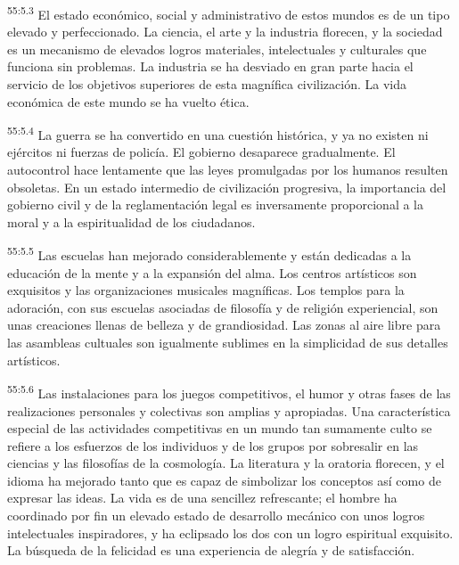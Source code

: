 \par
\textsuperscript{55:5.3} El estado económico, social y administrativo de estos mundos es de un tipo elevado y perfeccionado. La ciencia, el arte y la industria florecen, y la sociedad es un mecanismo de elevados logros materiales, intelectuales y culturales que funciona sin problemas. La industria se ha desviado en gran parte hacia el servicio de los objetivos superiores de esta magnífica civilización. La vida económica de este mundo se ha vuelto ética.

\par
\textsuperscript{55:5.4} La guerra se ha convertido en una cuestión histórica, y ya no existen ni ejércitos ni fuerzas de policía. El gobierno desaparece gradualmente. El autocontrol hace lentamente que las leyes promulgadas por los humanos resulten obsoletas. En un estado intermedio de civilización progresiva, la importancia del gobierno civil y de la reglamentación legal es inversamente proporcional a la moral y a la espiritualidad de los ciudadanos.

\par
\textsuperscript{55:5.5} Las escuelas han mejorado considerablemente y están dedicadas a la educación de la mente y a la expansión del alma. Los centros artísticos son exquisitos y las organizaciones musicales magníficas. Los templos para la adoración, con sus escuelas asociadas de filosofía y de religión experiencial, son unas creaciones llenas de belleza y de grandiosidad. Las zonas al aire libre para las asambleas cultuales son igualmente sublimes en la simplicidad de sus detalles artísticos.

\par
\textsuperscript{55:5.6} Las instalaciones para los juegos competitivos, el humor y otras fases de las realizaciones personales y colectivas son amplias y apropiadas. Una característica especial de las actividades competitivas en un mundo tan sumamente culto se refiere a los esfuerzos de los individuos y de los grupos por sobresalir en las ciencias y las filosofías de la cosmología. La literatura y la oratoria florecen, y el idioma ha mejorado tanto que es capaz de simbolizar los conceptos así como de expresar las ideas. La vida es de una sencillez refrescante; el hombre ha coordinado por fin un elevado estado de desarrollo mecánico con unos logros intelectuales inspiradores, y ha eclipsado los dos con un logro espiritual exquisito. La búsqueda de la felicidad es una experiencia de alegría y de satisfacción.

